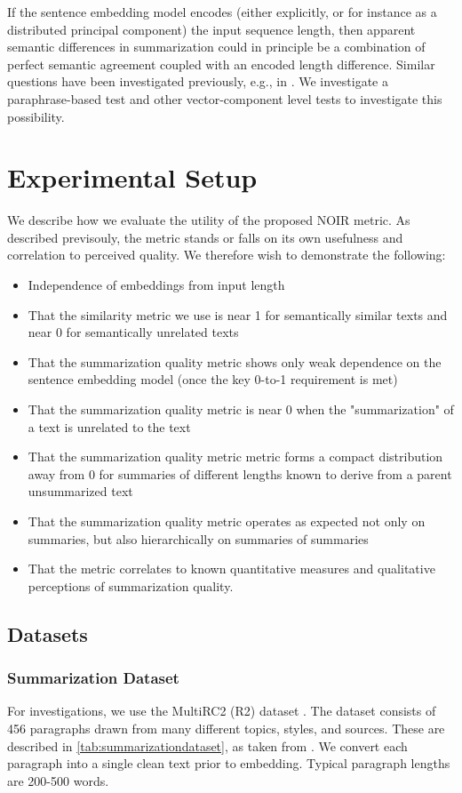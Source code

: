 \documentclass{article}
\begin{document}
If the sentence embedding model encodes (either explicitly, or for instance as a distributed principal component) the input sequence length, then apparent semantic differences in summarization could in principle be a combination of perfect semantic agreement coupled with an encoded length difference.  
Similar questions have been investigated previously, e.g., in \citep{finegrained}.
We investigate a paraphrase-based test and other vector-component level tests to investigate this possibility.


\section{Experimental Setup}

We describe how we evaluate the utility of the proposed NOIR metric.  
As described previsouly, the metric stands or falls on its own usefulness and correlation to perceived quality.
We therefore wish to demonstrate the following:

\begin{itemize}
	\item Independence of embeddings from input length
	\item That the similarity metric we use is near 1 for semantically similar texts and near 0 for semantically unrelated texts
    \item That the summarization quality metric shows only weak dependence on the sentence embedding model (once the key 0-to-1 requirement is met)
	\item That the summarization quality metric is near 0 when the "summarization" of a text is unrelated to the text
	\item That the summarization quality metric metric forms a compact distribution away from 0 for summaries of different lengths known to derive from a parent unsummarized text
	\item That the summarization quality metric operates as expected not only on summaries, but also hierarchically on summaries of summaries
	\item That the metric correlates to known quantitative measures and qualitative perceptions of summarization quality.
\end{itemize}

\subsection{Datasets}

\subsubsection{Summarization Dataset}
For investigations, we use the MultiRC2 (R2) dataset \citep{multirc2}.
The dataset consists of 456 paragraphs drawn from many different topics, styles, and sources.
These are described in \ref{tab:summarizationdataset}, as taken from \citep{multirc2}.
We convert each paragraph into a single clean text prior to embedding.
Typical paragraph lengths are 200-500 words.
\end{document}
